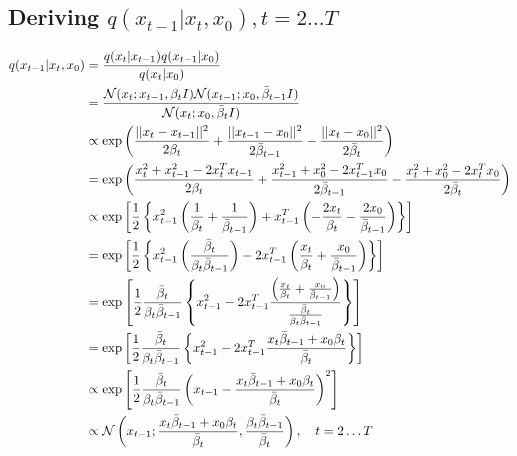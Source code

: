  \subsection{Deriving $q(x_{t-1}|x_t,x_0), t=2\hdots T$}
 \begin{align}
     q(x_{t-1}|x_t,x_0)&=\frac{q(x_t|x_{t-1})q(x_{t-1}|x_0)}{q(x_t|x_0)}\\
     &=\frac{\mathcal N(x_t;x_{t-1},\beta_t I)\mathcal N(x_{t-1};x_0,\bar\beta_{t-1} I)}
     {\mathcal N(x_t;x_0,\bar\beta_t I)}\\
     &\propto\exp\left( \frac{||x_t-x_{t-1}||^2}{2\beta_t}
     + \frac{||x_{t-1}-x_{0}||^2}{2\bar\beta_{t-1}}
     - \frac{||x_t-x_{0}||^2}{2\bar\beta_{t}} \right)\\
     &=\exp\left( \frac{x_t^2+x_{t-1}^2-2x_t^Tx_{t-1}}{2\beta_t}
     + \frac{x_{t-1}^2+x_{0}^2-2x_{t-1}^Tx_{0}}{2\bar\beta_{t-1}}
     - \frac{x_t^2+x_{0}^2-2x_t^Tx_0}{2\bar\beta_{t}} \right)\\
     &\propto\exp\left[\frac12\left\{
     x_{t-1}^2\left(\frac{1}{\beta_t}+\frac{1}{\bar\beta_{t-1}}\right)
     + x_{t-1}^T\left(
     -\frac{2x_t}{\beta_{t}}
     -\frac{2x_0}{\bar\beta_{t-1}}
     \right)
     \right\}\right]
     \\
     &=\exp\left[\frac12\left\{
     x_{t-1}^2\left(\frac{\bar\beta_{t}}{\beta_t \bar\beta_{t-1}}\right)
     -2 x_{t-1}^T\left(
     \frac{x_t}{\beta_{t}}
     +\frac{x_0}{\bar\beta_{t-1}}
     \right)
     \right\}\right]
     \\
     &=\exp\left[\frac12 \frac{\bar\beta_{t}}{\beta_t \bar\beta_{t-1}}\left\{
     x_{t-1}^2
     -2 x_{t-1}^T\frac{\left(
     \frac{x_t}{\beta_{t}}
     +\frac{x_0}{\bar\beta_{t-1}}
     \right)}{\frac{\bar\beta_{t}}{\beta_t \bar\beta_{t-1}}}
     \right\}\right]
     \\
     &=\exp\left[\frac12 \frac{\bar\beta_{t}}{\beta_t \bar\beta_{t-1}}\left\{
     x_{t-1}^2
     -2 x_{t-1}^T\frac{
     {x_t\bar\beta_{t-1}}
     +{x_0\beta_t}
     }{\bar\beta_{t}}
     \right\}\right]
     \\
     &\propto\exp\left[\frac12 \frac{\bar\beta_{t}}{\beta_t \bar\beta_{t-1}}\left(
     x_{t-1}
     -\frac{
     {x_t\bar\beta_{t-1}}
     +{x_0\beta_t}
     }{\bar\beta_{t}}
     \right)^2
     \right]
     \\
     &\propto
     \mathcal N\left(x_{t-1}; 
     \frac{
     {x_t\bar\beta_{t-1}}
     +{x_0\beta_t}
     }{\bar\beta_{t}}
     , 
     \frac{\beta_t \bar\beta_{t-1}}{\bar\beta_{t}}
     \right), \quad t=2\hdots T
 \end{align}

